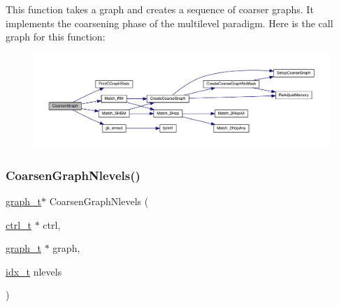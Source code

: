 This function takes a graph and creates a sequence of coarser graphs. It implements the coarsening phase of the multilevel paradigm. Here is the call graph for this function\+:\nopagebreak
\begin{figure}[H]
\begin{center}
\leavevmode
\includegraphics[width=350pt]{a00182_adeb2c7c9bffbeca00fcc97854fb88ada_cgraph}
\end{center}
\end{figure}
\mbox{\label{a00182_afa83320e3b311e0feef90d0bf4303716}} 
\subsubsection{\texorpdfstring{Coarsen\+Graph\+Nlevels()}{CoarsenGraphNlevels()}}
{\footnotesize\ttfamily \hyperlink{a00734}{graph\+\_\+t}$\ast$ Coarsen\+Graph\+Nlevels (\begin{DoxyParamCaption}\item[{\hyperlink{a00742}{ctrl\+\_\+t} $\ast$}]{ctrl,  }\item[{\hyperlink{a00734}{graph\+\_\+t} $\ast$}]{graph,  }\item[{\hyperlink{a00876_aaa5262be3e700770163401acb0150f52}{idx\+\_\+t}}]{nlevels }\end{DoxyParamCaption})}

